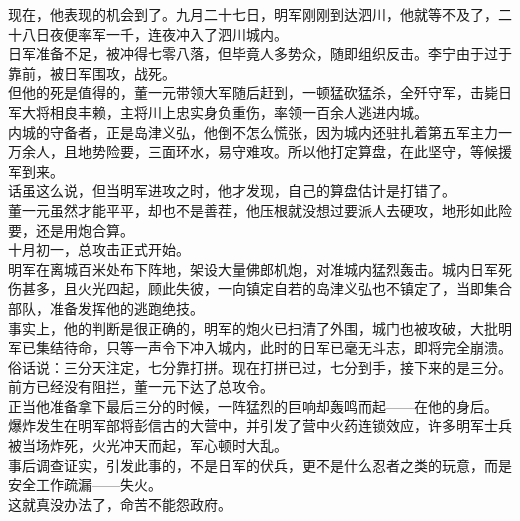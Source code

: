 \begin{multicols}{\theparacolNo}
现在，他表现的机会到了。九月二十七日，明军刚刚到达泗川，他就等不及了，二十八日夜便率军一千，连夜冲入了泗川城内。\\

日军准备不足，被冲得七零八落，但毕竟人多势众，随即组织反击。李宁由于过于靠前，被日军围攻，战死。\\

但他的死是值得的，董一元带领大军随后赶到，一顿猛砍猛杀，全歼守军，击毙日军大将相良丰赖，主将川上忠实身负重伤，率领一百余人逃进内城。\\

内城的守备者，正是岛津义弘，他倒不怎么慌张，因为城内还驻扎着第五军主力一万余人，且地势险要，三面环水，易守难攻。所以他打定算盘，在此坚守，等候援军到来。\\

话虽这么说，但当明军进攻之时，他才发现，自己的算盘估计是打错了。\\

董一元虽然才能平平，却也不是善茬，他压根就没想过要派人去硬攻，地形如此险要，还是用炮合算。\\

十月初一，总攻击正式开始。\\

明军在离城百米处布下阵地，架设大量佛郎机炮，对准城内猛烈轰击。城内日军死伤甚多，且火光四起，顾此失彼，一向镇定自若的岛津义弘也不镇定了，当即集合部队，准备发挥他的逃跑绝技。\\

事实上，他的判断是很正确的，明军的炮火已扫清了外围，城门也被攻破，大批明军已集结待命，只等一声令下冲入城内，此时的日军已毫无斗志，即将完全崩溃。\\

俗话说：三分天注定，七分靠打拼。现在打拼已过，七分到手，接下来的是三分。\\

前方已经没有阻拦，董一元下达了总攻令。\\

正当他准备拿下最后三分的时候，一阵猛烈的巨响却轰鸣而起——在他的身后。\\

爆炸发生在明军部将彭信古的大营中，并引发了营中火药连锁效应，许多明军士兵被当场炸死，火光冲天而起，军心顿时大乱。\\

事后调查证实，引发此事的，不是日军的伏兵，更不是什么忍者之类的玩意，而是安全工作疏漏——失火。\\

这就真没办法了，命苦不能怨政府。\\


\end{multicols}
